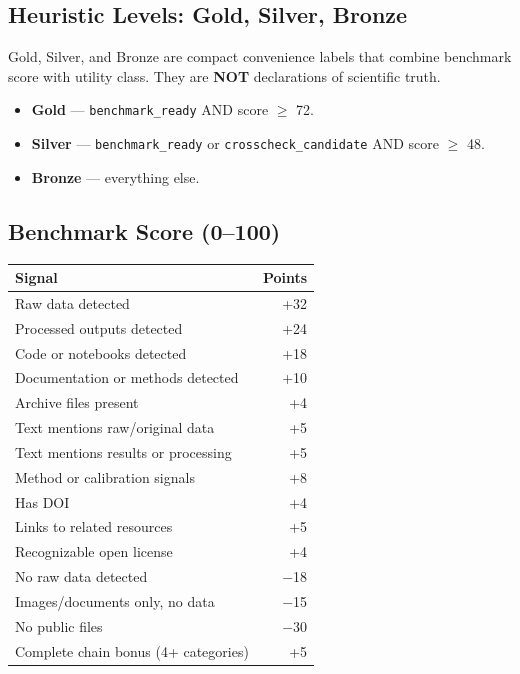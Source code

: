 \documentclass[11pt,a4paper]{article}
\begin{document}
\subsection{Heuristic Levels: Gold, Silver, Bronze}

Gold, Silver, and Bronze are compact convenience labels that combine benchmark score with utility class. They are \textbf{NOT} declarations of scientific truth.

\begin{itemize}[nosep]
  \item \textbf{Gold} --- \texttt{benchmark\_ready} AND score $\ge$ 72.
  \item \textbf{Silver} --- \texttt{benchmark\_ready} or \texttt{crosscheck\_candidate} AND score $\ge$ 48.
  \item \textbf{Bronze} --- everything else.
\end{itemize}

\subsection{Benchmark Score (0--100)}

\begin{center}
\begin{tabular}{lr}
\toprule
\textbf{Signal} & \textbf{Points} \\
\midrule
Raw data detected & +32 \\
Processed outputs detected & +24 \\
Code or notebooks detected & +18 \\
Documentation or methods detected & +10 \\
Archive files present & +4 \\
Text mentions raw/original data & +5 \\
Text mentions results or processing & +5 \\
Method or calibration signals & +8 \\
Has DOI & +4 \\
Links to related resources & +5 \\
Recognizable open license & +4 \\
No raw data detected & $-$18 \\
Images/documents only, no data & $-$15 \\
No public files & $-$30 \\
Complete chain bonus (4+ categories) & +5 \\
\bottomrule
\end{tabular}
\end{center}
\end{document}
